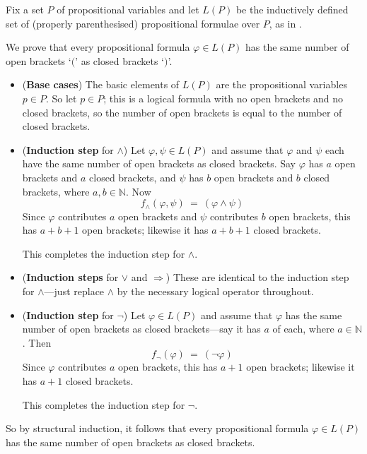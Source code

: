 \begin{example}
Fix a set $P$ of propositional variables and let $L(P)$ be the inductively defined set of (properly parenthesised) propositional formulae over $P$, as in .

We prove that every propositional formula $\varphi \in L(P)$ has the same number of open brackets `$($' as closed brackets `$)$'.

\begin{itemize}
\item (\textbf{Base cases}) The basic elements of $L(P)$ are the propositional variables $p \in P$. So let $p \in P$; this is a logical formula with no open brackets and no closed brackets, so the number of open brackets is equal to the number of closed brackets.

\item (\textbf{Induction step} for $\wedge$) Let $\varphi, \psi \in L(P)$ and assume that $\varphi$ and $\psi$ each have the same number of open brackets as closed brackets. Say $\varphi$ has $a$ open brackets and $a$ closed brackets, and $\psi$ has $b$ open brackets and $b$ closed brackets, where $a,b \in \mathbb{N}$. Now
\[ f_{\wedge}(\varphi, \psi) ~=~ (\varphi \wedge \psi) \]
Since $\varphi$ contributes $a$ open brackets and $\psi$ contributes $b$ open brackets, this has $a+b+1$ open brackets; likewise it has $a+b+1$ closed brackets.

This completes the induction step for $\wedge$.

\item (\textbf{Induction steps} for $\vee$ and $\Rightarrow$) These are identical to the induction step for $\wedge$---just replace $\wedge$ by the necessary logical operator throughout.

\item (\textbf{Induction step} for $\neg$) Let $\varphi \in L(P)$ and assume that $\varphi$ has the same number of open brackets as closed brackets---say it has $a$ of each, where $a \in \mathbb{N}$. Then
\[ f_{\neg}(\varphi) ~=~ (\neg \varphi) \]
Since $\varphi$ contributes $a$ open brackets, this has $a+1$ open brackets; likewise it has $a+1$ closed brackets.

This completes the induction step for $\neg$.
\end{itemize}

So by structural induction, it follows that every propositional formula $\varphi \in L(P)$ has the same number of open brackets as closed brackets.
\end{example}


